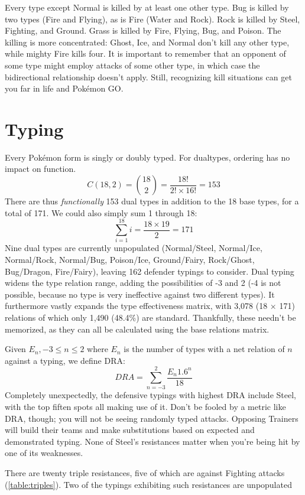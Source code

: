 Every type except Normal is killed by at least one other type.
Bug is killed by two types (Fire and Flying), as is Fire (Water and Rock).
Rock is killed by Steel, Fighting, and Ground.
Grass is killed by Fire, Flying, Bug, and Poison.
The killing is more concentrated: Ghost, Ice, and Normal don't kill
  any other type, while mighty Fire kills four.
It is important to remember that an opponent of some type might
  employ attacks of some other type, in which case the bidirectional
  relationship doesn't apply.
Still, recognizing kill situations can get you
  far in life and Pokémon GO\@.

\section{Typing\label{sec:dualtypes}}
Every Pokémon form is singly or doubly typed.
For dualtypes, ordering has no impact on function.
\[ C(18, 2) = \binom{18}{2} = \frac{18!}{2! \times 16!} = 153 \]
There are thus \textit{functionally} 153 dual types in addition to the 18 base types, for a total of 171.
We could also simply sum 1 through 18:
\[ \sum_{i=1}^{18} i = \frac{18 \times 19}{2} = 171 \]
Nine dual types are currently unpopulated (Normal/Steel, Normal/Ice, Normal/Rock,
 Normal/Bug, Poison/Ice, Ground/Fairy, Rock/Ghost, Bug/Dragon, Fire/Fairy),
 leaving 162 defender typings to consider.
Dual typing widens the type relation range, adding the possibilities
 of -3 and 2 (-4 is not possible, because no type is very ineffective against
 two different types).
It furthermore vastly expands the type effectiveness matrix,
 with 3,078 (18 × 171) relations of which only 1,490 (48.4\%) are standard.
Thankfully, these needn't be memorized, as they can all be calculated
 using the base relations matrix.

Given $E_{n}, -3 \le n \le 2$ where $E_n$ is the number of types with
  a net relation of $n$ against a typing, we define DRA\@:
\[  DRA = \sum_{n=-3}^{2} \frac{E_{n}1.6^n}{18} \]
Completely unexpectedly, the defensive typings with highest DRA include Steel,
  with the top fiften spots all making use of it.
Don't be fooled by a metric like DRA, though; you will not be seeing
  randomly typed attacks.
Opposing Trainers will build their teams and make substitutions based on
  expected and demonstrated typing.
None of Steel's resistances matter when you're being hit by one of its
  weaknesses.

There are twenty triple resistances, five of which are against Fighting attacks (\autoref{table:triples}).
Two of the typings exhibiting such resistances are unpopulated
